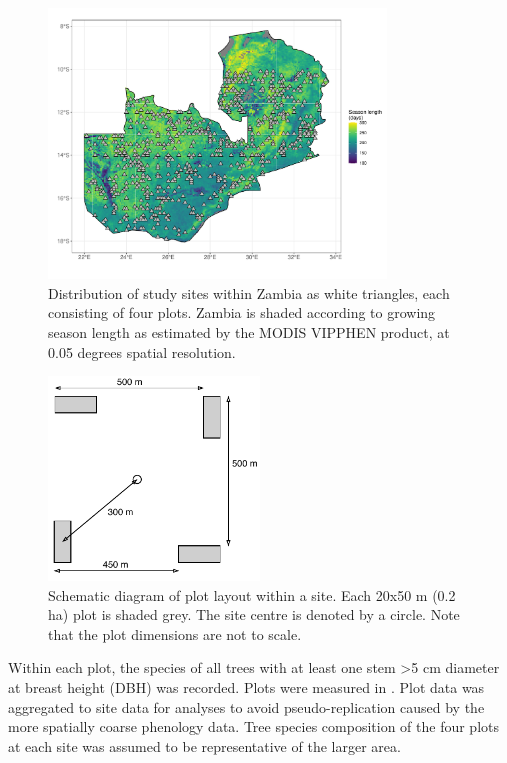 \documentclass[11pt,a4paper]{article}
\begin{document}
\begin{figure}[H]
\centering
	\includegraphics[width=0.8\textwidth]{plot_loc}
	\caption{Distribution of study sites within Zambia as white triangles, each consisting of four plots. Zambia is shaded according to growing season length as estimated by the MODIS VIPPHEN product, at 0.05 degrees spatial resolution.}
	\label{plot_loc}
\end{figure}

\begin{figure}[H]
\centering
	\includegraphics[width=0.5\textwidth]{schematic.drawio}
	\caption{Schematic diagram of plot layout within a site. Each 20x50 m (0.2 ha) plot is shaded grey. The site centre is denoted by a circle. Note that the plot dimensions are not to scale.}
	\label{schematic}
\end{figure}

Within each plot, the species of all trees with at least one stem >5 cm diameter at breast height (DBH) was recorded. Plots were measured in \censusDate{}. Plot data was aggregated to site data for analyses to avoid pseudo-replication caused by the more spatially coarse phenology data. Tree species composition of the four plots at each site was assumed to be representative of the larger area.
\end{document}
